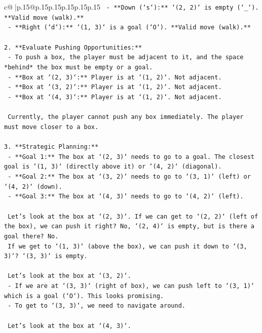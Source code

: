 \documentclass{article}
\begin{document}
{\begin{supertabular}{c@{$\;$}|p{.15\linewidth}@{}p{.15\linewidth}p{.15\linewidth}p{.15\linewidth}p{.15\linewidth}p{.15\linewidth}}
{{{\texttt{    {-} **Down (`s`):** `(2, 2)` is empty (`\_`). **Valid move (walk).**} \\
\texttt{    {-} **Right (`d`):** `(1, 3)` is a goal (`O`). **Valid move (walk).**} \\
\\ 
\texttt{2.  **Evaluate Pushing Opportunities:**} \\
\texttt{    {-} To push a box, the player must be adjacent to it, and the space *behind* the box must be empty or a goal.} \\
\texttt{    {-} **Box at `(2, 3)`:** Player is at `(1, 2)`. Not adjacent.} \\
\texttt{    {-} **Box at `(3, 2)`:** Player is at `(1, 2)`. Not adjacent.} \\
\texttt{    {-} **Box at `(4, 3)`:** Player is at `(1, 2)`. Not adjacent.} \\
\\ 
\texttt{    Currently, the player cannot push any box immediately. The player must move closer to a box.} \\
\\ 
\texttt{3.  **Strategic Planning:**} \\
\texttt{    {-} **Goal 1:** The box at `(2, 3)` needs to go to a goal. The closest goal is `(1, 3)` (directly above it) or `(4, 2)` (diagonal).} \\
\texttt{    {-} **Goal 2:** The box at `(3, 2)` needs to go to `(3, 1)` (left) or `(4, 2)` (down).} \\
\texttt{    {-} **Goal 3:** The box at `(4, 3)` needs to go to `(4, 2)` (left).} \\
\\ 
\texttt{    Let's look at the box at `(2, 3)`. If we can get to `(2, 2)` (left of the box), we can push it right? No, `(2, 4)` is empty, but is there a goal there? No.} \\
\texttt{    If we get to `(1, 3)` (above the box), we can push it down to `(3, 3)`? `(3, 3)` is empty.} \\
\\ 
\texttt{    Let's look at the box at `(3, 2)`.} \\
\texttt{    {-} If we are at `(3, 3)` (right of box), we can push left to `(3, 1)` which is a goal (`O`). This looks promising.} \\
\texttt{    {-} To get to `(3, 3)`, we need to navigate around.} \\
\\ 
\texttt{    Let's look at the box at `(4, 3)`.} \\
}}}
\end{supertabular}}
\end{document}
